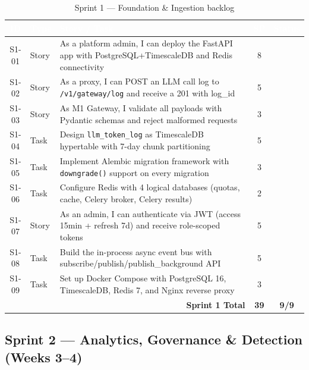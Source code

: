 \documentclass[12pt,a4paper,twoside]{report}
\newcommand{\cmark}{\ding{51}}
\begin{document}
\begin{table}[H]
\centering
\small
\begin{tabularx}{\textwidth}{|c|l|X|c|c|}
\hline
\rowcolor{tabheader}
\textcolor{white}{\textbf{ID}} &
\textcolor{white}{\textbf{Type}} &
\textcolor{white}{\textbf{Story / Task}} &
\textcolor{white}{\textbf{SP}} &
\textcolor{white}{\textbf{Status}} \\
\hline
S1-01 & Story & As a platform admin, I can deploy the FastAPI app with PostgreSQL+TimescaleDB and Redis connectivity & 8 & \cmark \\
\hline
S1-02 & Story & As a proxy, I can POST an LLM call log to \texttt{/v1/gateway/log} and receive a 201 with log\_id & 5 & \cmark \\
\hline
S1-03 & Story & As M1 Gateway, I validate all payloads with Pydantic schemas and reject malformed requests & 3 & \cmark \\
\hline
S1-04 & Task & Design \texttt{llm\_token\_log} as TimescaleDB hypertable with 7-day chunk partitioning & 5 & \cmark \\
\hline
S1-05 & Task & Implement Alembic migration framework with \texttt{downgrade()} support on every migration & 3 & \cmark \\
\hline
S1-06 & Task & Configure Redis with 4 logical databases (quotas, cache, Celery broker, Celery results) & 2 & \cmark \\
\hline
S1-07 & Story & As an admin, I can authenticate via JWT (access 15min + refresh 7d) and receive role-scoped tokens & 5 & \cmark \\
\hline
S1-08 & Task & Build the in-process async event bus with subscribe/publish/publish\_background API & 5 & \cmark \\
\hline
S1-09 & Task & Set up Docker Compose with PostgreSQL 16, TimescaleDB, Redis 7, and Nginx reverse proxy & 3 & \cmark \\
\hline
\multicolumn{3}{|r|}{\textbf{Sprint 1 Total}} & \textbf{39} & \textbf{9/9} \\
\hline
\end{tabularx}
\caption{Sprint 1 — Foundation \& Ingestion backlog}
\end{table}

\subsection{Sprint 2 — Analytics, Governance \& Detection (Weeks 3--4)}
\end{document}

